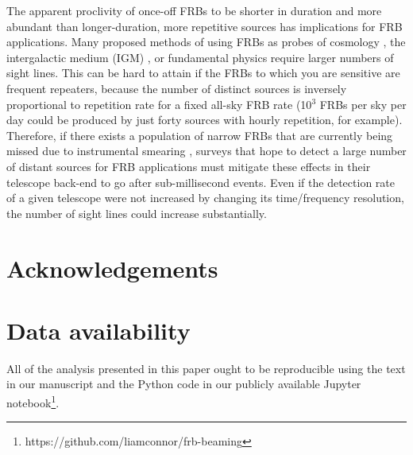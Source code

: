 \documentclass[fleqn,usenatbib]{mnras}
\begin{document}
The apparent proclivity of once-off FRBs to be 
shorter in duration and more abundant than 
longer-duration, more repetitive sources has implications 
for FRB applications. Many proposed methods of 
using FRBs as probes of cosmology \citep{weltman-2019, Madhavacheril-2019}, the intergalactic medium (IGM) \citep{mcquinn2014, vedantham2019}, or fundamental physics \citep{munoz2016, eichler-2017} 
require larger numbers of sight lines.
This can be hard to attain if the FRBs to which you are 
sensitive are frequent repeaters, because the number 
of distinct sources is inversely proportional to 
repetition rate for a fixed all-sky FRB rate (10$^3$ FRBs 
per sky per day could be produced by just forty sources with 
hourly repetition, for example).
Therefore, if there 
exists a population of narrow FRBs that are currently being 
missed due to instrumental smearing \citep{connor-2019}, surveys that hope to detect a large number of distant sources for 
FRB applications must mitigate these effects in their 
telescope back-end to go after sub-millisecond events. 
Even if the detection rate 
of a given telescope were not increased by changing its 
time/frequency resolution, the number of sight lines 
could increase substantially.


\section*{Acknowledgements}


\section{Data availability}
All of the analysis presented in this paper ought to 
be reproducible using the text in our manuscript and 
the Python code in our publicly available 
Jupyter notebook\footnote{https://github.com/liamconnor/frb-beaming}.






\end{document}
